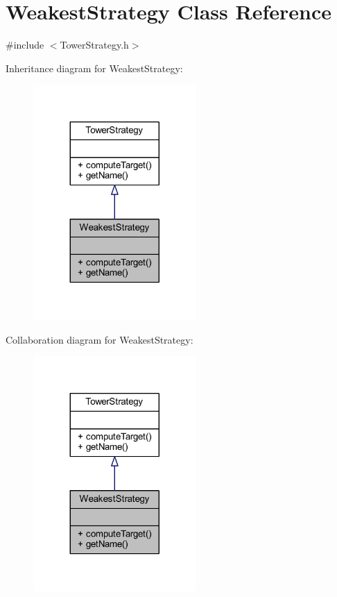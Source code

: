\hypertarget{class_weakest_strategy}{\section{Weakest\+Strategy Class Reference}
\label{class_weakest_strategy}
}


{\ttfamily \#include $<$Tower\+Strategy.\+h$>$}



Inheritance diagram for Weakest\+Strategy\+:\nopagebreak
\begin{figure}[H]
\begin{center}
\leavevmode
\includegraphics[width=176pt]{class_weakest_strategy__inherit__graph}
\end{center}
\end{figure}


Collaboration diagram for Weakest\+Strategy\+:\nopagebreak
\begin{figure}[H]
\begin{center}
\leavevmode
\includegraphics[width=176pt]{class_weakest_strategy__coll__graph}
\end{center}
\end{figure}
